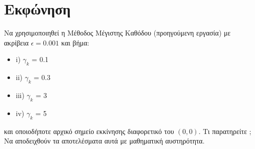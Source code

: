 \documentclass{report}
\begin{document}
\section{Εκφώνηση}
Να χρησιμοποιηθεί η Μέθοδος Μέγιστης Καθόδου (προηγούμενη εργασία) με ακρίβεια $\epsilon =
0.001$ και βήμα:
\begin{itemize}
    \item i) $\gamma_k$ = 0.1
    \item ii) $\gamma_k$ = 0.3
    \item iii) $\gamma_k$ = 3
    \item iv) $\gamma_k$ = 5
\end{itemize}
και οποιοδήποτε αρχικό σημείο εκκίνησης διαφορετικό του $(0,0)$. Τι παρατηρείτε
; Να αποδειχθούν τα αποτελέσματα αυτά 
με μαθηματική αυστηρότητα.
\end{document}
